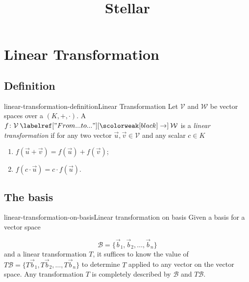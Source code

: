 \documentclass[preview]{standalone}
\begin{document}
\title{Stellar}
\genpage

\section{Linear Transformation}

\subsection{Definition}

\begin{snippetdefinition}{linear-transformation-definition}{Linear Transformation}
    Let \(\mathcal{V}\) and \(\mathcal{W}\) be vector spaces over a \field \((K, +, \cdot)\).
    A \function \(f \colon \mathcal{V} \fromto \mathcal{W}\) is a
    \textit{linear transformation} if for any two vector \(\vec{u}, \vec{v} \in \mathcal{V}\)
    and any scalar \(c\in K\)
    \begin{enumerate}
        \item \(f(\vec{u} + \vec{v}) = f(\vec{u}) + f(\vec{v})\);
        \item \(f(c\cdot\vec{u}) = c\cdot f(\vec{u})\).
    \end{enumerate}
\end{snippetdefinition}

\subsection{The basis}


\begin{snippettheorem}{linear-transformation-on-basis}{Linear transformation on basis}
    Given a basis for a vector space

    \[
        \mathcal{B}=\{\vec{b}_1, \vec{b}_2, \ldots, \vec{b}_n\}
    \]
    and a linear transformation \(T\), it suffices
    to know the value of \(T\mathcal{B}=\{T\vec{b}_1, T\vec{b}_2, \ldots, T\vec{b}_n\}\)
    to determine \(T\) applied to any vector on the vector space.
    Any transformation \(T\) is completely described by \(\mathcal{B}\)
    and \(T\mathcal{B}\).
\end{snippettheorem}
\end{document}
